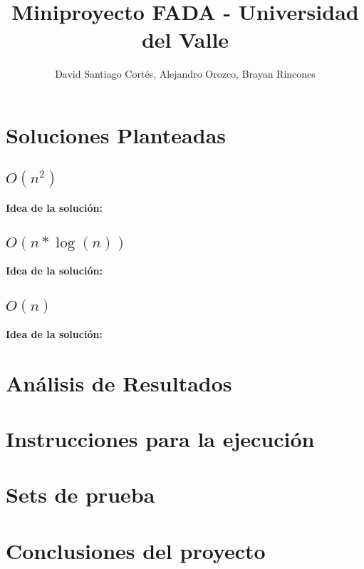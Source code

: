\documentclass{article}
\title{Miniproyecto FADA - Universidad del Valle}
\date{}
\author{David Santiago Cortés, Alejandro Orozco, Brayan Rincones}
\begin{document}
	\maketitle

	\section{Soluciones Planteadas}
		\subsection{$O(n^2)$}
			\textbf{Idea de la solución:}

		\subsection{$O(n*\log(n))$}
			\textbf{Idea de la solución:}
		\subsection{$O(n)$}
			\textbf{Idea de la solución:}

	\section{Análisis de Resultados}

	\section{Instrucciones para la ejecución}

	\section{Sets de prueba}

	\section{Conclusiones del proyecto}
\end{document}
